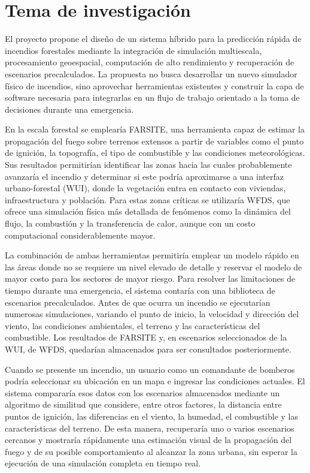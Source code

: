 \clearpage
\section{Tema de investigación}

El proyecto propone el diseño de un sistema híbrido para la predicción rápida de incendios forestales mediante la integración de simulación multiescala, procesamiento geoespacial, computación de alto rendimiento y recuperación de escenarios precalculados. La propuesta no busca desarrollar un nuevo simulador físico de incendios, sino aprovechar herramientas existentes y construir la capa de software necesaria para integrarlas en un flujo de trabajo orientado a la toma de decisiones durante una emergencia.

En la escala forestal se emplearía FARSITE, una herramienta capaz de estimar la propagación del fuego sobre terrenos extensos a partir de variables como el punto de ignición, la topografía, el tipo de combustible y las condiciones meteorológicas. Sus resultados permitirían identificar las zonas hacia las cuales probablemente avanzaría el incendio y determinar si este podría aproximarse a una interfaz urbano-forestal (WUI), donde la vegetación entra en contacto con viviendas, infraestructura y población. Para estas zonas críticas se utilizaría WFDS, que ofrece una simulación física más detallada de fenómenos como la dinámica del flujo, la combustión y la transferencia de calor, aunque con un costo computacional considerablemente mayor.

La combinación de ambas herramientas permitiría emplear un modelo rápido en las áreas donde no se requiere un nivel elevado de detalle y reservar el modelo de mayor costo para los sectores de mayor riesgo. Para resolver las limitaciones de tiempo durante una emergencia, el sistema contaría con una biblioteca de escenarios precalculados. Antes de que ocurra un incendio se ejecutarían numerosas simulaciones, variando el punto de inicio, la velocidad y dirección del viento, las condiciones ambientales, el terreno y las características del combustible. Los resultados de FARSITE y, en escenarios seleccionados de la WUI, de WFDS, quedarían almacenados para ser consultados posteriormente.

Cuando se presente un incendio, un usuario como un comandante de bomberos podría seleccionar su ubicación en un mapa e ingresar las condiciones actuales. El sistema compararía esos datos con los escenarios almacenados mediante un algoritmo de similitud que considere, entre otros factores, la distancia entre puntos de ignición, las diferencias en el viento, la humedad, el combustible y las características del terreno. De esta manera, recuperaría uno o varios escenarios cercanos y mostraría rápidamente una estimación visual de la propagación del fuego y de su posible comportamiento al alcanzar la zona urbana, sin esperar la ejecución de una simulación completa en tiempo real.


